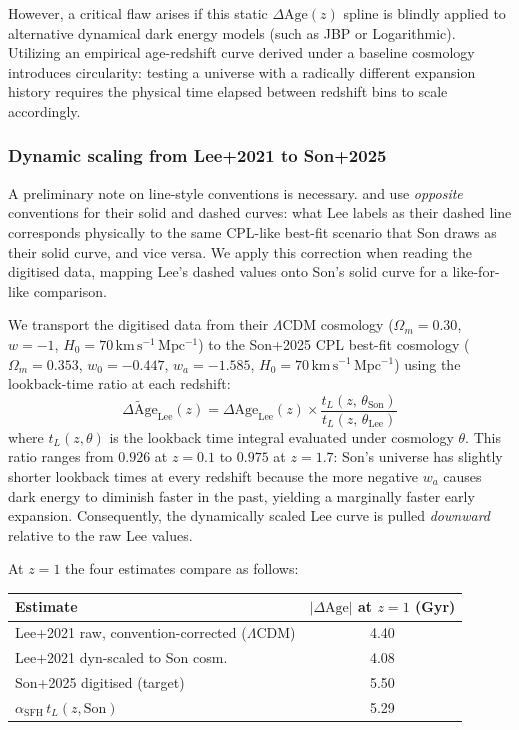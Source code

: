 \documentclass[12pt, a4paper]{article}
\begin{document}
However, a critical flaw arises if this static $\Delta \text{Age}(z)$ spline is blindly applied to alternative dynamical dark energy models (such as JBP or Logarithmic). Utilizing an empirical age-redshift curve derived under a baseline cosmology introduces circularity: testing a universe with a radically different expansion history requires the physical time elapsed between redshift bins to scale accordingly.

\subsubsection*{Dynamic scaling from Lee+2021 to Son+2025}

A preliminary note on line-style conventions is necessary. \citet{lee2021} and \citet{son2025} use \emph{opposite} conventions for their solid and dashed curves: what Lee labels as their dashed line corresponds physically to the same CPL-like best-fit scenario that Son draws as their solid curve, and vice versa. We apply this correction when reading the digitised data, mapping Lee's dashed values onto Son's solid curve for a like-for-like comparison.

We transport the \citet{lee2021} digitised data from their $\Lambda$CDM cosmology ($\Omega_m=0.30$, $w=-1$, $H_0=70\,\mathrm{km\,s^{-1}\,Mpc^{-1}}$) to the Son+2025 CPL best-fit cosmology ($\Omega_m=0.353$, $w_0=-0.447$, $w_a=-1.585$, $H_0=70\,\mathrm{km\,s^{-1}\,Mpc^{-1}}$) using the lookback-time ratio at each redshift:
\begin{equation}
    \widetilde{\Delta\text{Age}}_\text{Lee}(z) = \Delta\text{Age}_\text{Lee}(z) \times \frac{t_L(z,\,\theta_\text{Son})}{t_L(z,\,\theta_\text{Lee})}
\end{equation}
where $t_L(z,\theta)$ is the lookback time integral evaluated under cosmology $\theta$. This ratio ranges from $0.926$ at $z=0.1$ to $0.975$ at $z=1.7$: Son's universe has slightly shorter lookback times at every redshift because the more negative $w_a$ causes dark energy to diminish faster in the past, yielding a marginally faster early expansion. Consequently, the dynamically scaled Lee curve is pulled \emph{downward} relative to the raw Lee values.

At $z=1$ the four estimates compare as follows:
\begin{center}
\begin{tabular}{lc}
\toprule
Estimate & $|\Delta\text{Age}|$ at $z=1$ (Gyr) \\ \midrule
Lee+2021 raw, convention-corrected ($\Lambda$CDM) & 4.40 \\
Lee+2021 dyn-scaled to Son cosm.                  & 4.08 \\
Son+2025 digitised (target)                       & 5.50 \\
$\alpha_\mathrm{SFH}\,t_L(z,\text{Son})$         & 5.29 \\ \bottomrule
\end{tabular}
\end{center}
\end{document}
